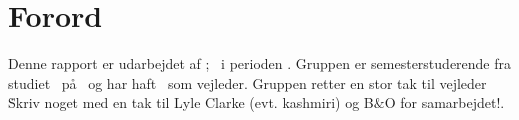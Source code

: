 \chapter*{Forord}
\label{Forord}
Denne rapport er udarbejdet af \groupname; \groupmembers\ i perioden \projectperiod. Gruppen er \semester semesterstuderende fra studiet \studyname\ på \universityname\ og har haft \supervisor\ som vejleder. Gruppen retter en stor tak til vejleder \supervisor\.
 Skriv noget med en tak til Lyle Clarke (evt. kashmiri) og B$\&$O for samarbejdet!.
%
